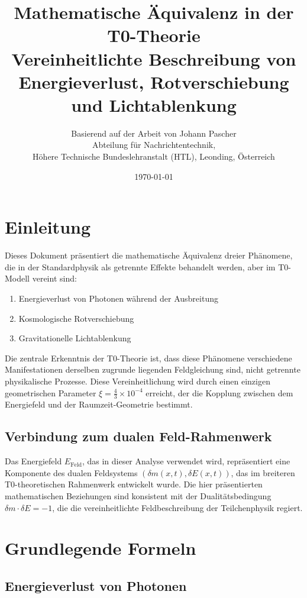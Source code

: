 \documentclass[12pt,a4paper]{article}
\title{\Huge\textbf{Mathematische \"Aquivalenz in der T0-Theorie}\\\Large Vereinheitlichte Beschreibung von Energieverlust, Rotverschiebung und Lichtablenkung}
\author{Basierend auf der Arbeit von Johann Pascher\\
	Abteilung f\"ur Nachrichtentechnik, \\H\"ohere Technische Bundeslehranstalt (HTL), Leonding, \"Osterreich}
\date{\today}
\newcommand{\efield}{E_{\text{Feld}}}
\theoremstyle{definition}
\begin{document}
	
	\maketitle
	\tableofcontents
	\thispagestyle{fancy}
	\newpage
	
	\section{Einleitung}
	
	Dieses Dokument pr\"asentiert die mathematische \"Aquivalenz dreier Ph\"anomene, die in der Standardphysik als getrennte Effekte behandelt werden, aber im T0-Modell vereint sind:
	
	\begin{enumerate}
		\item Energieverlust von Photonen w\"ahrend der Ausbreitung
		\item Kosmologische Rotverschiebung
		\item Gravitationelle Lichtablenkung
	\end{enumerate}
	
	Die zentrale Erkenntnis der T0-Theorie ist, dass diese Ph\"anomene verschiedene Manifestationen derselben zugrunde liegenden Feldgleichung sind, nicht getrennte physikalische Prozesse. Diese Vereinheitlichung wird durch einen einzigen geometrischen Parameter $\xi = \frac{4}{3} \times 10^{-4}$ erreicht, der die Kopplung zwischen dem Energiefeld und der Raumzeit-Geometrie bestimmt.
	
	\subsection{Verbindung zum dualen Feld-Rahmenwerk}
	
	Das Energiefeld $\efield$, das in dieser Analyse verwendet wird, repr\"asentiert eine Komponente des dualen Feldsystems $(\delta m(x,t), \delta E(x,t))$, das im breiteren T0-theoretischen Rahmenwerk entwickelt wurde. Die hier pr\"asentierten mathematischen Beziehungen sind konsistent mit der Dualit\"atsbedingung $\delta m \cdot \delta E = -1$, die die vereinheitlichte Feldbeschreibung der Teilchenphysik regiert.
	
	\section{Grundlegende Formeln}
	
	\subsection{Energieverlust von Photonen}
	
\end{document}
